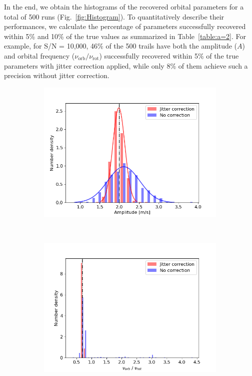 In the end, we obtain the histograms of the recovered orbital parameters for a total of 500 runs (Fig.~\ref{fig:Histogram}). To quantitatively describe their performances, we calculate the percentage of parameters successfully recovered within 5\% and 10\% of the true values as summarized in Table~\ref{table:a=2}. For example, for S/N = 10,000, 46\% of the 500 trails have both the amplitude ($A$) and orbital frequency ($\nu_\text{orb}/\nu_\text{rot}$) successfully recovered within 5\% of the true parameters with jitter correction applied, while only 8\% of them achieve such a precision without jitter correction. 

\begin{figure}[tbp]	
    \begin{subfigure}[b]{0.49\textwidth}
        \includegraphics[width=\textwidth]{./Figures/Methods/Histogram_new1_p2_sn10000.png}
    \end{subfigure}
	~
    \begin{subfigure}[b]{0.49\textwidth}
        \includegraphics[width=\textwidth]{./Figures/Methods/Histogram_new2_p2_sn10000.png}

\end{subfigure}
\end{figure}
